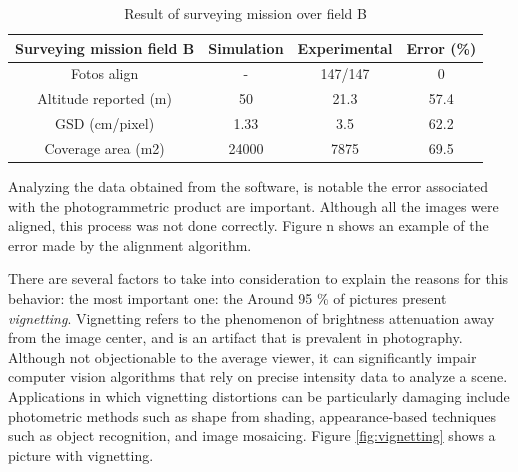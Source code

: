 \begin{table}[H]
\centering
\begin{tabular}{|c|c|c|c|}
\hline
Surveying mission field B & Simulation & Experimental & Error (\%) \\ \hline
Fotos align               & -          & 147/147      & 0          \\ \hline
Altitude reported (m)     & 50         & 21.3         & 57.4       \\ \hline
GSD (cm/pixel)            & 1.33       & 3.5          & 62.2       \\ \hline
Coverage area (m2)        & 24000      & 7875         & 69.5       \\ \hline
\end{tabular}
\caption{Result of surveying mission over field B}
\label{Table:ResultsB}
\end{table}
Analyzing the data obtained from the software, is notable the error associated with the photogrammetric product are important. Although all the images were aligned, this process was not done correctly. Figure n shows an example of the error made by the alignment algorithm. 

There are several factors to take into consideration to explain the reasons for this behavior: the most important one: the Around 95 \% of pictures present \textit{vignetting}. Vignetting refers to the phenomenon of brightness attenuation away from the image center, and is an artifact that is prevalent in photography. Although not objectionable to the average viewer, it can significantly impair computer vision algorithms that rely on precise intensity data to analyze a scene. Applications in which vignetting distortions can be particularly damaging include photometric methods such as shape from shading, appearance-based techniques such as object recognition, and image mosaicing.  Figure \ref{fig:vignetting} shows a picture with vignetting.\cite{4663074}

